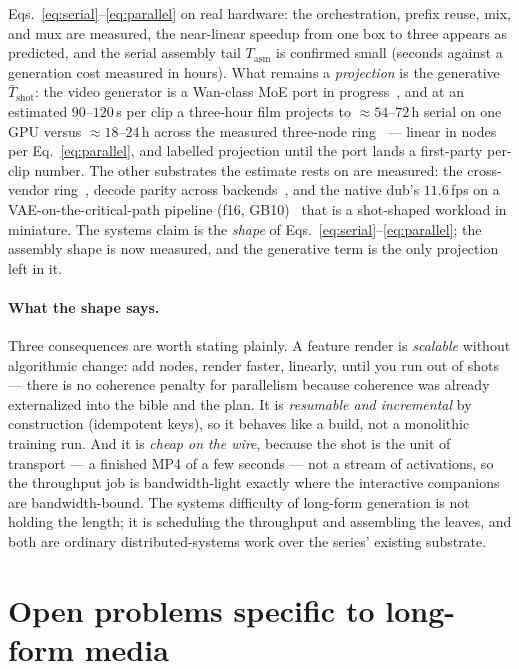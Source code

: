 \documentclass[11pt]{article}
\newcommand{\Tshot}{\ensuremath{\bar{T}_{\mathrm{shot}}}}
\newcommand{\Tasm}{\ensuremath{T_{\mathrm{asm}}}}
\begin{document}
Eqs.~\eqref{eq:serial}--\eqref{eq:parallel} on real hardware: the orchestration, prefix reuse, mix, and mux are
measured, the near-linear speedup from one box to three appears as predicted, and the serial assembly tail
$\Tasm$ is confirmed small (seconds against a generation cost measured in hours). What remains a
\emph{projection} is the generative $\Tshot$: the video generator is a Wan-class MoE port in progress~\cite{wan},
and at an estimated $90$--$120$\,s per clip a three-hour film projects to $\approx\!54$--$72$\,h serial on one
GPU versus $\approx\!18$--$24$\,h across the measured three-node ring~\cite{het} --- linear in nodes per
Eq.~\eqref{eq:parallel}, and labelled projection until the port lands a first-party per-clip number. The other
substrates the estimate rests on are measured: the cross-vendor ring~\cite{het}, decode parity across
backends~\cite{backend}, and the native dub's $11.6$\,fps on a VAE-on-the-critical-path pipeline (f16,
GB10)~\cite{games} that is a shot-shaped workload in miniature. The systems claim is the \emph{shape} of
Eqs.~\eqref{eq:serial}--\eqref{eq:parallel}; the assembly shape is now measured, and the generative term is the
only projection left in it.

\paragraph{What the shape says.} Three consequences are worth stating plainly. A feature render is
\emph{scalable} without algorithmic change: add nodes, render faster, linearly, until you run out of shots ---
there is no coherence penalty for parallelism because coherence was already externalized into the bible and the
plan. It is \emph{resumable and incremental} by construction (idempotent keys), so it behaves like a build, not a
monolithic training run. And it is \emph{cheap on the wire}, because the shot is the unit of transport --- a
finished MP4 of a few seconds --- not a stream of activations, so the throughput job is bandwidth-light exactly
where the interactive companions are bandwidth-bound. The systems difficulty of long-form generation is not
holding the length; it is scheduling the throughput and assembling the leaves, and both are ordinary
distributed-systems work over the series' existing substrate.

\section{Open problems specific to long-form media}
\label{sec:open}
\end{document}

